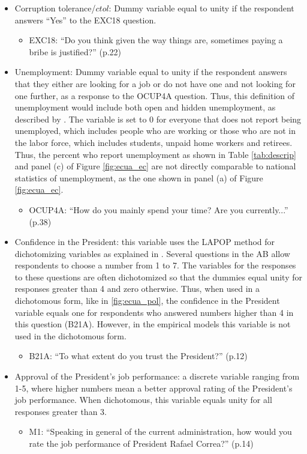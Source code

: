 \documentclass[12pt,a4]{article}\usepackage[]{graphicx}\usepackage[]{xcolor}
\begin{document}
\begin{itemize}
\item Corruption tolerance/$ctol$: Dummy variable equal to unity if the respondent answers \enquote{Yes} to the EXC18 question.
  \begin{itemize}
    \item EXC18: \enquote{Do you think given the way things are, sometimes paying a bribe is justified?} (p.22)
  \end{itemize}
\item Unemployment: Dummy variable equal to unity if the respondent answers that they either are looking for a job or do not have one and not looking for one further, as a response to the OCUP4A question. Thus, this definition of unemployment would include both open and hidden unemployment, as described by \textcite{INEC.2018}. The variable is set to 0 for everyone that does not report being unemployed, which includes people who are working or those who are not in the labor force, which includes students, unpaid home workers and retirees. Thus, the percent who report unemployment as shown in Table \ref{tab:descrip} and panel (c) of Figure \ref{fig:ecua_ec} are not directly comparable to national statistics of unemployment, as the one shown in panel (a) of Figure \ref{fig:ecua_ec}. 
  \begin{itemize}
    \item OCUP4A: \enquote{How do you mainly spend your time? Are you currently...} (p.38)
  \end{itemize}

\item Confidence in the President: this variable uses the LAPOP method for dichotomizing variables as explained in \textcite{Moscoso.2020}. Several questions in the AB allow respondents to choose a number from 1 to 7. The variables for the responses to these questions are often dichotomized so that the dummies equal unity for responses greater than 4 and zero otherwise. Thus, when used in a dichotomous form, like in \ref{fig:ecua_pol}, the confidence in the President variable equals one for respondents who answered numbers higher than 4 in this question (B21A). However, in the empirical models this variable is not used in the dichotomous form. 
  \begin{itemize}
    \item B21A: \enquote{To what extent do you trust the President?} (p.12)
  \end{itemize}
\item Approval of the President's job performance: a discrete variable ranging from 1-5, where higher numbers mean a better approval rating of the President's job performance. When dichotomous, this variable equals unity for all responses greater than 3.
  \begin{itemize}
    \item M1: \enquote{Speaking in general of the current administration, how would you
rate the job performance of President Rafael Correa?} (p.14)
  \end{itemize}


\end{itemize}
\end{document}
